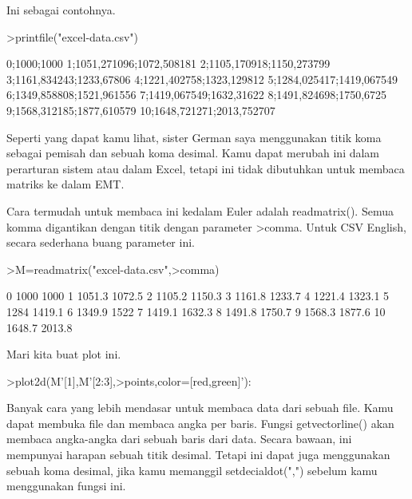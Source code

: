 \documentclass[a4paper,10pt]{article}
\begin{document}
\begin{eulernotebook}
\begin{eulercomment}
\begin{eulercomment}
\begin{eulercomment}
\begin{eulercomment}
\begin{eulercomment}
\begin{eulercomment}
\begin{eulercomment}
Ini sebagai contohnya.
\end{eulercomment}
\begin{eulerprompt}
>printfile("excel-data.csv")
\end{eulerprompt}
\begin{euleroutput}
  0;1000;1000
  1;1051,271096;1072,508181
  2;1105,170918;1150,273799
  3;1161,834243;1233,67806
  4;1221,402758;1323,129812
  5;1284,025417;1419,067549
  6;1349,858808;1521,961556
  7;1419,067549;1632,31622
  8;1491,824698;1750,6725
  9;1568,312185;1877,610579
  10;1648,721271;2013,752707
\end{euleroutput}
\begin{eulercomment}
Seperti yang dapat kamu lihat, sister German saya menggunakan titik
koma sebagai pemisah dan sebuah koma desimal. Kamu dapat merubah ini
dalam perarturan sistem atau dalam Excel, tetapi ini tidak dibutuhkan
untuk membaca matriks ke dalam EMT.

Cara termudah untuk membaca ini kedalam Euler adalah readmatrix().
Semua komma digantikan dengan titik dengan parameter \textgreater{}comma. Untuk CSV
English, secara sederhana buang parameter ini.
\end{eulercomment}
\begin{eulerprompt}
>M=readmatrix("excel-data.csv",>comma)
\end{eulerprompt}
\begin{euleroutput}
          0      1000      1000 
          1    1051.3    1072.5 
          2    1105.2    1150.3 
          3    1161.8    1233.7 
          4    1221.4    1323.1 
          5      1284    1419.1 
          6    1349.9      1522 
          7    1419.1    1632.3 
          8    1491.8    1750.7 
          9    1568.3    1877.6 
         10    1648.7    2013.8 
\end{euleroutput}
\begin{eulercomment}
Mari kita buat plot ini.
\end{eulercomment}
\begin{eulerprompt}
>plot2d(M'[1],M'[2:3],>points,color=[red,green]'):
\end{eulerprompt}
\begin{eulercomment}
Banyak cara yang lebih mendasar untuk membaca data dari sebuah file.
Kamu dapat membuka file dan membaca angka per baris. Fungsi
getvectorline() akan membaca angka-angka dari sebuah baris dari data.
Secara bawaan, ini mempunyai harapan sebuah titik desimal. Tetapi ini
dapat juga menggunakan sebuah koma desimal, jika kamu memanggil
setdecialdot(",") sebelum kamu menggunakan fungsi ini.


\end{eulercomment}
\end{eulercomment}
\end{eulercomment}
\end{eulercomment}
\end{eulercomment}
\end{eulercomment}
\end{eulercomment}
\end{eulernotebook}
\end{document}
